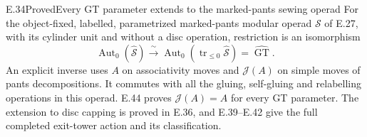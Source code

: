 \begin{result}{E.34}{Proved}{Every GT parameter extends to the marked-pants sewing operad}
For the object-fixed, labelled, parametrized marked-pants
modular operad $\mathcal S$ of E.27, with its cylinder
unit and without a disc operation, restriction is an
isomorphism
\[
 \operatorname{Aut}_0(\widehat{\mathcal S})
       \xrightarrow{\ \sim\ }
 \operatorname{Aut}_0(\operatorname{tr}_{\leq0}
                       \widehat{\mathcal S})
       =\widehat{\operatorname{GT}}.                    \tag{E.110}
\]
An explicit inverse uses $A$ on associativity moves
and $\mathcal J(A)$ on simple moves of pants
decompositions.  It commutes with all the gluing,
self-gluing and relabelling operations in this
operad. E.44 proves $\mathcal J(A)=A$ for every
GT parameter. The extension to disc capping is
proved in E.36, and E.39--E.42 give the full
completed exit-tower action and its classification.
\end{result}
